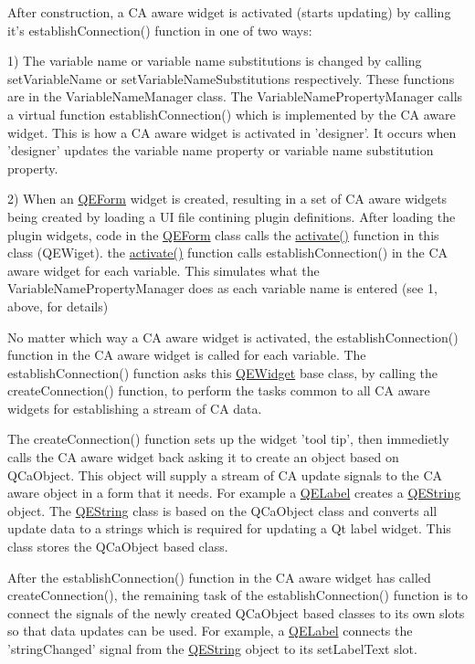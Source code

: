After construction, a CA aware widget is activated (starts updating) by calling it's establishConnection() function in one of two ways:

1) The variable name or variable name substitutions is changed by calling setVariableName or setVariableNameSubstitutions respectively. These functions are in the VariableNameManager class. The VariableNamePropertyManager calls a virtual function establishConnection() which is implemented by the CA aware widget. This is how a CA aware widget is activated in 'designer'. It occurs when 'designer' updates the variable name property or variable name substitution property.

2) When an \hyperlink{classQEForm}{QEForm} widget is created, resulting in a set of CA aware widgets being created by loading a UI file contining plugin definitions. After loading the plugin widgets, code in the \hyperlink{classQEForm}{QEForm} class calls the \hyperlink{classQEWidget_a0990c7f67d2f8211c5225c88c304e708}{activate()} function in this class (QEWiget). the \hyperlink{classQEWidget_a0990c7f67d2f8211c5225c88c304e708}{activate()} function calls establishConnection() in the CA aware widget for each variable. This simulates what the VariableNamePropertyManager does as each variable name is entered (see 1, above, for details)

No matter which way a CA aware widget is activated, the establishConnection() function in the CA aware widget is called for each variable. The establishConnection() function asks this \hyperlink{classQEWidget}{QEWidget} base class, by calling the createConnection() function, to perform the tasks common to all CA aware widgets for establishing a stream of CA data.

The createConnection() function sets up the widget 'tool tip', then immedietly calls the CA aware widget back asking it to create an object based on QCaObject. This object will supply a stream of CA update signals to the CA aware object in a form that it needs. For example a \hyperlink{classQELabel}{QELabel} creates a \hyperlink{classQEString}{QEString} object. The \hyperlink{classQEString}{QEString} class is based on the QCaObject class and converts all update data to a strings which is required for updating a Qt label widget. This class stores the QCaObject based class.

After the establishConnection() function in the CA aware widget has called createConnection(), the remaining task of the establishConnection() function is to connect the signals of the newly created QCaObject based classes to its own slots so that data updates can be used. For example, a \hyperlink{classQELabel}{QELabel} connects the 'stringChanged' signal from the \hyperlink{classQEString}{QEString} object to its setLabelText slot. 

